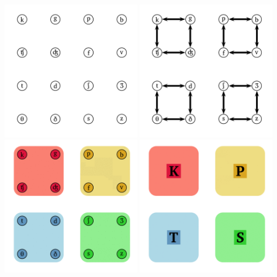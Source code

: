\includegraphics[width=0.45\textwidth]{img/classes-0.png}
\includegraphics[width=0.45\textwidth]{img/classes-1.png}
\includegraphics[width=0.45\textwidth]{img/classes-2.png}
\includegraphics[width=0.45\textwidth]{img/classes-3.png}




